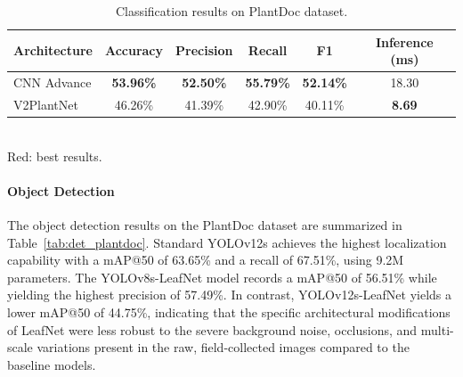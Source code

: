 \documentclass[10pt, conference]{IEEEtran}
\begin{document}
\begin{table}[t]
    \centering
    \caption{Classification results on PlantDoc dataset.}
    \label{tab:cls_plantdoc}
    \setlength{\tabcolsep}{5pt}
    \begin{tabular}{lccccc}
        \toprule
        \textbf{Architecture} & \textbf{Accuracy} & \textbf{Precision}
                              & \textbf{Recall} & \textbf{F1}
                              & \textbf{Inference (ms)} \\
        \midrule
        CNN Advance
            & \textcolor{bestred}{\textbf{53.96\%}}
            & \textcolor{bestred}{\textbf{52.50\%}}
            & \textcolor{bestred}{\textbf{55.79\%}}
            & \textcolor{bestred}{\textbf{52.14\%}}
            & 18.30 \\
        V2PlantNet
            & 46.26\% & 41.39\% & 42.90\% & 40.11\% & \textcolor{bestred}{\textbf{8.69}} \\
        \bottomrule
    \end{tabular}\\[4pt]
    {\small \textcolor{bestred}{Red}: best results.}
\end{table}

\paragraph{Object Detection}

The object detection results on the PlantDoc dataset are summarized in Table~\ref{tab:det_plantdoc}. Standard YOLOv12s achieves the highest localization capability with a mAP@50 of 63.65\% and a recall of 67.51\%, using 9.2M parameters. The YOLOv8s-LeafNet model records a mAP@50 of 56.51\% while yielding the highest precision of 57.49\%. In contrast, YOLOv12s-LeafNet yields a lower mAP@50 of 44.75\%, indicating that the specific architectural modifications of LeafNet were less robust to the severe background noise, occlusions, and multi-scale variations present in the raw, field-collected images compared to the baseline models.
\end{document}
